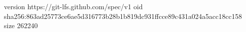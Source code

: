 version https://git-lfs.github.com/spec/v1
oid sha256:863ad25773ce6ae5d316773b28b1b819dc931ffcce89c431a024a5acc18cc158
size 262240
